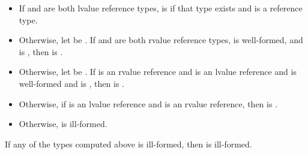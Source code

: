 \begin{itemize}
\item If  and  are both lvalue reference types,
   is
   if that type exists
  and is a reference type.
\item Otherwise, let  be
  .
  If  and  are both rvalue reference types,
   is well-formed, and
   is ,
  then  is .
\item Otherwise, let  be
  . If  is an rvalue
  reference and  is an lvalue reference and  is
  well-formed and  is
  , then  is .
\item Otherwise, if  is an lvalue reference and 
  is an rvalue reference, then  is
  .
\item Otherwise,  is ill-formed.
\end{itemize}

If any of the types computed above is ill-formed, then
 is ill-formed.

